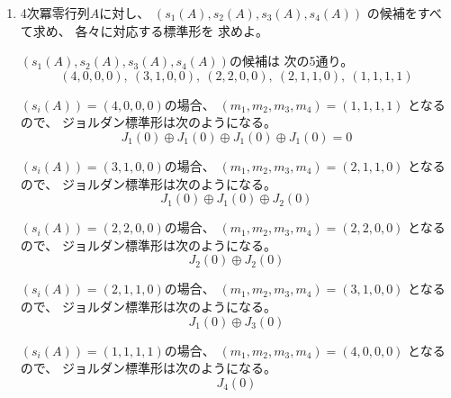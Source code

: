 \documentclass[12pt,b5paper]{ltjsarticle}
\begin{document}
\begin{enumerate}
 \item
      4次冪零行列$A$に対し、
      $(s_1(A),s_2(A),s_3(A),s_4(A))$
      の候補をすべて求め、
      各々に対応する標準形を
      求めよ。

\dotfill

      $(s_1(A),s_2(A),s_3(A),s_4(A))$の候補は
      次の5通り。
      \begin{equation}
        (4,0,0,0),\ (3,1,0,0),\ (2,2,0,0),\ (2,1,1,0),\ (1,1,1,1)
      \end{equation}

      $(s_i(A))=(4,0,0,0)$の場合、
      $(m_1,m_2,m_3,m_4)=(1,1,1,1)$
      となるので、
      ジョルダン標準形は次のようになる。
      \begin{equation}
       J_1(0)\oplus J_1(0)\oplus J_1(0)\oplus J_1(0) = 0
      \end{equation}

      $(s_i(A))=(3,1,0,0)$の場合、
      $(m_1,m_2,m_3,m_4)=(2,1,1,0)$
      となるので、
      ジョルダン標準形は次のようになる。
      \begin{equation}
       J_1(0)\oplus J_1(0)\oplus J_2(0)
      \end{equation}

      $(s_i(A))=(2,2,0,0)$の場合、
      $(m_1,m_2,m_3,m_4)=(2,2,0,0)$
      となるので、
      ジョルダン標準形は次のようになる。
      \begin{equation}
       J_2(0)\oplus J_2(0)
      \end{equation}

      $(s_i(A))=(2,1,1,0)$の場合、
      $(m_1,m_2,m_3,m_4)=(3,1,0,0)$
      となるので、
      ジョルダン標準形は次のようになる。
      \begin{equation}
       J_1(0)\oplus J_3(0)
      \end{equation}

      $(s_i(A))=(1,1,1,1)$の場合、
      $(m_1,m_2,m_3,m_4)=(4,0,0,0)$
      となるので、
      ジョルダン標準形は次のようになる。
      \begin{equation}
       J_4(0)
      \end{equation}

\hrulefill


\end{enumerate}
\end{document}
